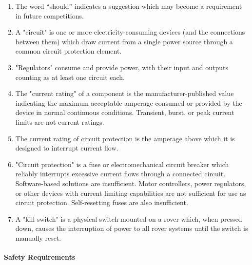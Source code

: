     \begin{enumerate}
        \item The word “should” indicates a suggestion which may become a requirement in future competitions.
        \item A "circuit" is one or more electricity-consuming devices (and the connections between them) which draw current from a single power source through a common circuit protection element.
        \item "Regulators" consume and provide power, with their input and outputs counting as at least one circuit each.
        \item The "current rating" of a component is the manufacturer-published value indicating the maximum acceptable amperage consumed or provided by the device in normal continuous conditions. Transient, burst, or peak current limits are not current ratings.
        \item The current rating of circuit protection is the amperage above which it is designed to interrupt current flow.
        \item "Circuit protection" is a fuse or electromechanical circuit breaker which reliably interrupts excessive current flows through a connected circuit. Software-based solutions are insufficient. Motor controllers, power regulators, or other devices with current limiting capabilities are not sufficient for use as circuit protection. Self-resetting fuses are also insufficient.
        \item A "kill switch" is a physical switch mounted on a rover which, when pressed down, causes the interruption of power to all rover systems until the switch is manually reset.
    \end{enumerate}

\paragraph{Safety Requirements}

